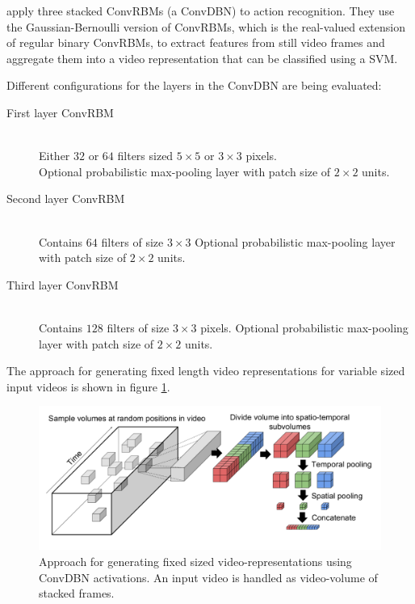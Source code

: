 \textcite{palasek_action_2016} apply three stacked ConvRBMs (a ConvDBN) to action recognition.
They use the Gaussian-Bernoulli version of ConvRBMs, which is the real-valued extension of regular binary ConvRBMs, to extract features from still video frames and aggregate them into a video representation that can be classified using a SVM.

Different configurations for the layers in the ConvDBN are being evaluated:
\begin{description}
    \item[First layer ConvRBM] \hfill \\
        Either $32$ or $64$ filters sized $5 \times 5$ or $3 \times 3$ pixels.\\
        Optional probabilistic max-pooling layer with patch size of $2 \times 2$ units.
    \item[Second layer ConvRBM] \hfill \\
        Contains $64$ filters of size $3 \times 3$
        Optional probabilistic max-pooling layer with patch size of $2 \times 2$ units.
    \item[Third layer ConvRBM] \hfill \\
        Contains $128$ filters of size $3 \times 3$ pixels.
        Optional probabilistic max-pooling layer with patch size of $2 \times 2$ units.
\end{description}

The approach for generating fixed length video representations for variable sized input videos is shown in figure \ref{fig:palasekpatras_approachschematik}.

\begin{figure}[H]
    \centering
    \includegraphics[width=\textwidth]{img_deep/palasekpatras_approachschematik}
    \caption{Approach for generating fixed sized video-representations using ConvDBN activations. An input video is handled as video-volume of stacked frames. \cite{lee_convolutional_2009-1}}
    \label{fig:palasekpatras_approachschematik}
\end{figure}

